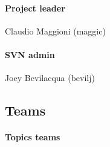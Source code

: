 \documentclass[hidelinks,12pt,a4paper,numbers=enddot]{scrartcl}
\begin{document}
\paragraph{Project leader}
Claudio Maggioni (maggic)

\paragraph{SVN admin}
Joey Bevilacqua (bevilj)

\subsection{Teams}

\paragraph{Topics teams}
\end{document}
